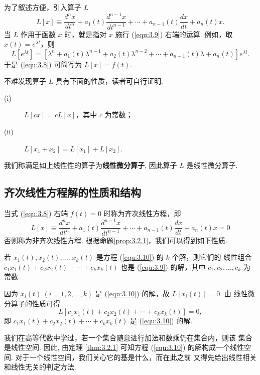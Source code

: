 为了叙述方便，引入算子 $L$
\begin{equation}\label{equ:3.9}
L[x]\equiv\frac{d^n x}{dt^n}+a_1(t)\frac{d^{n-1}x}{dt^{n-1}}+\cdots
+a_{n-1}(t)\frac{dx}{dt}+a_n(t)x.
\end{equation}
当 $L$ 作用于函数 $x$ 时，就是指对 $x$ 施行
(\ref{equ:3.9}) 右端的运算. 例如，取 $x(t)=e^{\lambda t}$，则
\[
L[e^{\lambda t}]=\left[\lambda^n+a_1(t)\lambda^{n-1}
+a_2(t)\lambda^{n-2}+\cdots+a_{n-1}(t)\lambda+a_n(t)\right]e^{\lambda t}.
\]
于是 (\ref{equ:3.8}) 可简写为 $L[x]=f(t)$.

不难发现算子 $L$ 具有下面的性质，读者可自行证明.
\begin{prop}\label{prop:3.2.1}
\begin{description}
\item[(i)] $L[cx]=cL[x]$，其中 $c$ 为常数；
\item[(ii)] $L[x_1+x_2]=L[x_1]+L[x_2]$.
\end{description}
\end{prop}
我们称满足如上线性性的算子为\textbf{线性微分算子}, 因此算子 $L$ 是线性微分算子.

\subsection{齐次线性方程解的性质和结构}
当式 (\ref{equ:3.8}) 右端 $f(t)=0$ 时称为齐次线性方程，即
\begin{equation}\label{equ:3.10}
L[x]\equiv\frac{d^n x}{dt^n}+a_1(t)\frac{d^{n-1}x}{dt^{n-1}}+\cdots
+a_{n-1}(t)\frac{dx}{dt}+a_n(t)x=0
\end{equation}
否则称为非齐次线性方程. 根据命题\ref{prop:3.2.1}，我们可以得到如下性质.
\begin{thm}[(叠加原理)]\label{thm:3.2.2}
若 $x_1(t),x_2(t),\dots,x_k(t)$ 是方程 (\ref{equ:3.10}) 的 $k$ 个解，则它们的
线性组合 $c_1x_1(t)+c_2x_2(t)+\cdots+c_kx_k(t)$ 也是 (\ref{equ:3.9}) 的解，其中
$c_1,c_2,\dots,c_k$ 为常数.
\end{thm}
\begin{pf1}
因为 $x_i(t)\ (i=1,2,\dots,k)$ 是 (\ref{equ:3.10}) 的解，故 $L[x_i(t)]=0$. 由
线性微分算子的性质可得
\[
L\left[c_1x_1(t)+c_2x_2(t)+\cdots+c_kx_k(t)\right]=0,
\]
即 $c_1x_1(t)+c_2x_2(t)+\cdots+c_kx_k(t)$ 是 (\ref{equ:3.10}) 的解.
\end{pf1}

我们在高等代数中学过，若一个集合随意进行加法和数乘仍在集合内，则该
集合是线性空间. 因此, 由定理 \ref{thm:3.2.1} 可知方程 (\ref{equ:3.10})
的解构成一个线性空间. 对于一个线性空间，我们关心它的基是什么，而在此之前
又得先给出线性相关和线性无关的判定方法.

